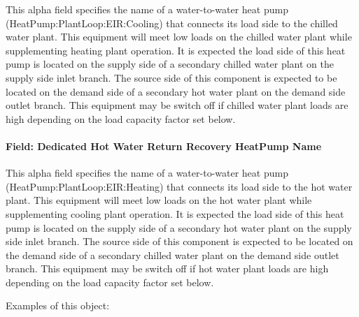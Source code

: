 This alpha field specifies the name of a water-to-water heat pump (HeatPump:PlantLoop:EIR:Cooling) that connects its load side to the chilled water plant. This equipment will meet low loads on the chilled water plant while supplementing heating plant operation. It is expected the load side of this heat pump is located on the supply side of a secondary chilled water plant on the supply side inlet branch. The source side of this component is expected to be located on the demand side of a secondary hot water plant on the demand side outlet branch. This equipment may be switch off if chilled water plant loads are high depending on the load capacity factor set below.

\paragraph{Field: Dedicated Hot Water Return Recovery HeatPump Name}\label{field-dedicated-hot-return-recovery-hp-name-plantequipmentoperationchillerheaterchangeover}

This alpha field specifies the name of a water-to-water heat pump (HeatPump:PlantLoop:EIR:Heating) that connects its load side to the hot water plant. This equipment will meet low loads on the hot water plant while supplementing cooling plant operation. It is expected the load side of this heat pump is located on the supply side of a secondary hot water plant on the supply side inlet branch. The source side of this component is expected to be located on the demand side of a secondary chilled water plant on the demand side outlet branch. This equipment may be switch off if hot water plant loads are high depending on the load capacity factor set below.

Examples of this object:

